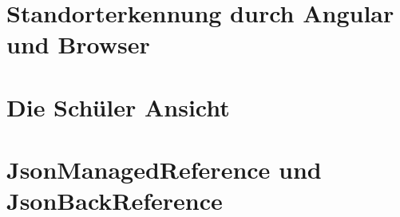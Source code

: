 \section{Standorterkennung durch Angular und Browser}


\section{Die Schüler Ansicht}

\section{JsonManagedReference und JsonBackReference}
    
